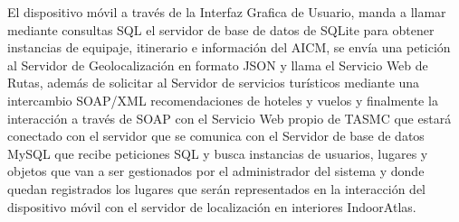 El dispositivo móvil a través de la Interfaz Grafica de Usuario, manda a llamar mediante consultas SQL el servidor de base de datos de SQLite para obtener instancias de equipaje, itinerario e información del AICM, se envía una petición al Servidor de Geolocalización en formato JSON y llama el Servicio Web de Rutas, además de solicitar al Servidor de servicios turísticos mediante una intercambio SOAP/XML recomendaciones de hoteles y vuelos y finalmente la interacción a través de SOAP con el Servicio Web propio de TASMC que estará conectado con el servidor que se comunica con el Servidor de base de datos MySQL  que recibe peticiones SQL y busca instancias de usuarios, lugares y objetos que van a ser gestionados por el administrador del sistema y donde quedan registrados los lugares que serán representados en la interacción del dispositivo móvil con el servidor de localización en interiores IndoorAtlas.
